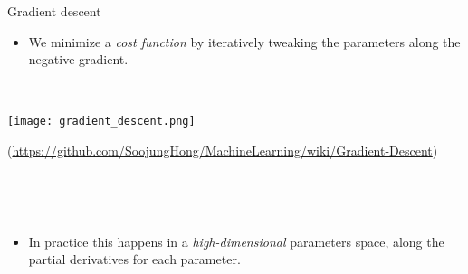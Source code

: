 \documentclass[
  10pt,
  ignorenonframetext,
]{beamer}
\providecommand{\tightlist}{%
  \setlength{\itemsep}{0pt}\setlength{\parskip}{0pt}}
\begin{document}
\begin{frame}
\begin{block}{Gradient descent}
\protect\hypertarget{gradient-descent}{}
\(~\)

\begin{itemize}
\tightlist
\item
  We minimize a \emph{cost function} by iteratively tweaking the
  parameters along the negative gradient.
\end{itemize}

\(~\)

\center

\texttt{[image: gradient\_descent.png]}

\tiny (\url{https://github.com/SoojungHong/MachineLearning/wiki/Gradient-Descent})

\(~\)

\(~\)

\normalsize
\flushleft

\begin{itemize}
\tightlist
\item
  In practice this happens in a \emph{high-dimensional} parameters
  space, along the partial derivatives for each parameter.
\end{itemize}
\end{block}
\end{frame}
\end{document}
